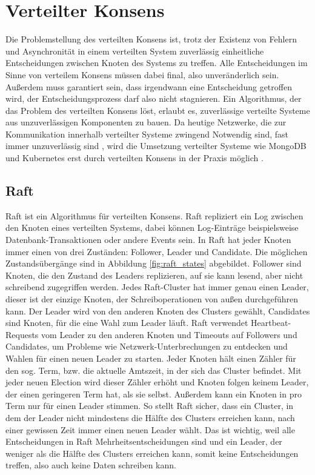 \documentclass[12pt,a4paper]{report}
\begin{document}
\section{Verteilter Konsens}
\label{chap:dist_consensus}
Die Problemstellung des verteilten Konsens ist, trotz der Existenz von Fehlern und Asynchronität in einem verteilten System
zuverlässig einheitliche Entscheidungen zwischen Knoten des Systems zu treffen. Alle Entscheidungen im Sinne von verteilem Konsens
müssen dabei final, also unveränderlich sein. Außerdem muss garantiert sein, dass irgendwann eine Entscheidung getroffen wird, der
Entscheidungsprozess darf also nicht stagnieren. Ein Algorithmus, der das Problem des verteilten Konsens löst, erlaubt es,
zuverlässige verteilte Systeme aus unzuverlässigen Komponenten zu bauen. \cite{distributed_consensus} Da heutige Netzwerke, die
zur Kommunikation innerhalb verteilter Systeme zwingend Notwendig sind, fast immer unzuverlässig sind
\cite{the_network_is_reliable}, wird die Umsetzung verteilter Systeme wie MongoDB und Kubernetes erst durch verteilten Konsens in
der Praxis möglich \cite{distributed_consensus}.

\subsection{Raft}
Raft ist ein Algorithmus für verteilten Konsens. Raft repliziert ein Log zwischen den Knoten eines verteilten Systems, dabei
können Log-Einträge beispielsweise Datenbank-Transaktionen oder andere Events sein. In Raft hat jeder Knoten immer einen von drei
Zuständen: Follower, Leader und Candidate. Die möglichen Zustandsübergänge sind in Abbildung \ref{fig:raft_states} abgebildet.
Follower sind Knoten, die den Zustand des Leaders replizieren, auf sie kann lesend, aber nicht schreibend zugegriffen werden.
Jedes Raft-Cluster hat immer genau einen Leader, dieser ist der einzige Knoten, der Schreiboperationen von außen durchgeführen
kann. Der Leader wird von den anderen Knoten des Clusters gewählt, Candidates sind Knoten, für die eine Wahl zum Leader läuft.
Raft verwendet Heartbeat-Requests vom Leader zu den anderen Knoten und Timeouts auf Followers und Candidates, um Probleme wie
Netzwerk-Unterbrechungen zu entdecken und Wahlen für einen neuen Leader zu starten. Jeder Knoten hält einen Zähler für den sog.
Term, bzw. die aktuelle Amtszeit, in der sich das Cluster befindet. Mit jeder neuen Election wird dieser Zähler erhöht und Knoten
folgen keinem Leader, der einen geringeren Term hat, als sie selbst. Außerdem kann ein Knoten in pro Term nur für einen Leader
stimmen. So stellt Raft sicher, dass ein Cluster, in dem der Leader nicht mindestens die Hälfte des Clusters erreichen kann, nach
einer gewissen Zeit immer einen neuen Leader wählt. Das ist wichtig, weil alle Entscheidungen in Raft Mehrheitsentscheidungen sind
und ein Leader, der weniger als die Hälfte des Clusters erreichen kann, somit keine Entscheidungen treffen, also auch keine Daten
schreiben kann. \cite{raft_original_paper}
\end{document}
